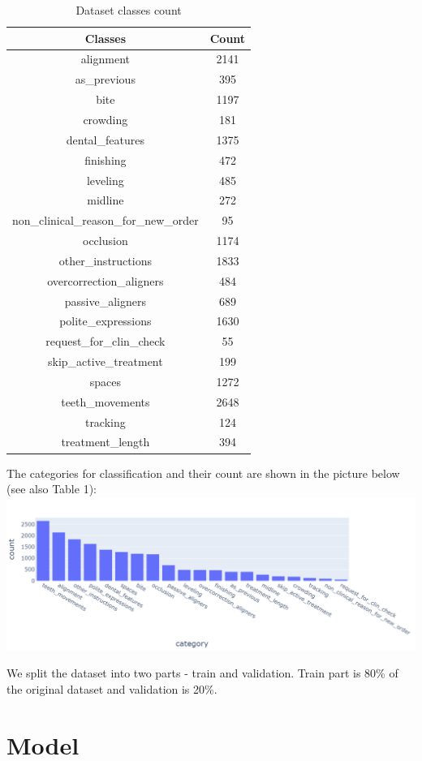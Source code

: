 \documentclass[11pt]{article}
\begin{document}
\begin{table}[h!]
\centering
\caption{Dataset classes count}
 \begin{tabular}{c c}
 \hline
 Classes & Count \\ [0.5ex] 
 \hline
 alignment 	& 2141 \\
as\_previous 	& 395 \\
bite 	& 1197 \\
crowding 	& 181 \\
dental\_features 	& 1375 \\
finishing 	& 472 \\
leveling 	& 485 \\
midline 	& 272 \\
non\_clinical\_reason\_for\_new\_order 	& 95 \\
occlusion 	& 1174 \\
other\_instructions 	& 1833 \\
overcorrection\_aligners 	& 484 \\
passive\_aligners 	& 689 \\
polite\_expressions 	& 1630 \\
request\_for\_clin\_check 	& 55 \\
skip\_active\_treatment 	& 199 \\
spaces 	& 1272 \\
teeth\_movements 	& 2648 \\
tracking 	& 124 \\
treatment\_length 	& 394 \\  [1ex]
 \hline
 \end{tabular}
\end{table}

The categories for classification and their count are shown in the picture below (see also Table 1):
\includegraphics[scale=0.2]{images/category.png}

We split the dataset into two parts - train and validation. Train part is 80\% of the original dataset and validation is 20\%.


\section{Model}
\end{document}

